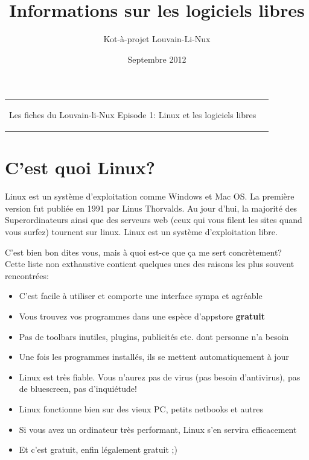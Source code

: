\documentclass[12pt,a4paper]{article}
\title{Informations sur les logiciels libres}
\author{Kot-à-projet Louvain-Li-Nux}
\date{Septembre 2012}
\begin{document}

\begin{tabular}{p{12cm}r}

\begin{center}{\Large Les fiches du Louvain-li-Nux\linebreak \linebreak
\LARGE Episode 1: Linux et les logiciels libres}\end{center}
&
\usebox{\logollnux}

\end{tabular}


\section*{C'est quoi Linux?}

Linux est un système d'exploitation comme Windows et Mac OS. La première version fut publiée en 1991 par Linus Thorvalds.
Au jour d'hui, la majorité des Superordinateurs ainsi que des serveurs web (ceux qui vous filent les sites quand vous surfez)
tournent sur linux. Linux est un système d'exploitation libre.
\vspace{0.5cm}

C'est bien bon dites vous, mais à quoi est-ce que ça me sert concrètement?\\
Cette liste non exthaustive contient quelques unes des raisons les plus souvent rencontrées:
\begin{itemize}
\item C'est facile à utiliser et comporte une interface sympa et agréable
\item Vous trouvez vos programmes dans une espèce d'appstore \textbf{gratuit}
\item Pas de toolbars inutiles, plugins, publicités etc. dont personne n'a besoin
\item Une fois les programmes installés, ils se mettent automatiquement à jour
\item Linux est très fiable. Vous n'aurez pas de virus (pas besoin d'antivirus), pas de bluescreen, pas d'inquiétude!
\item Linux fonctionne bien sur des vieux PC, petits netbooks et autres
\item Si vous avez un ordinateur très performant, Linux s'en servira efficacement
\item Et c'est gratuit, enfin légalement gratuit ;)
\end{itemize}
\end{document}
